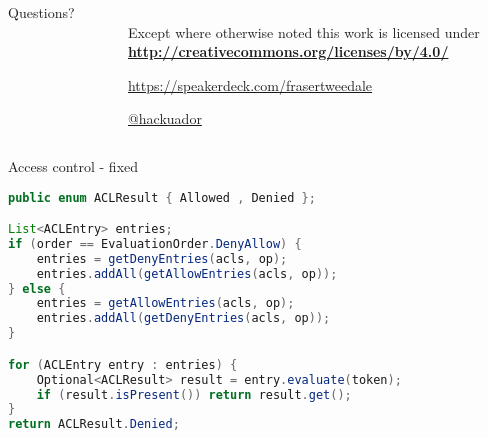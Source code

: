 \documentclass[ignorenonframetext,aspectratio=169,dvipsnames]{beamer}
\begin{document}
\begin{frame}[plain]
\begin{columns}

  \begin{column}{.4\textwidth}
    \begin{center}
    {
        \Large Questions?\\
        \medskip
    }
    \end{center}


  \end{column}

  \begin{column}{.6\textwidth}
    \hypersetup{urlcolor=black}

    \setlength{\parskip}{.5em}

    { \centering

    
    \\
    { \scriptsize
    Except where otherwise noted this work is licensed under
    }\\
    { \footnotesize
      \textbf{\url{http://creativecommons.org/licenses/by/4.0/}}
    }

    \bigskip
    \large \tt

    \url{https://speakerdeck.com/frasertweedale}

    \href{https://twitter.com/hackuador}{@hackuador}

    }
  \end{column}

\end{columns}
\end{frame}









\begin{frame}[fragile]{Access control - fixed}
\begin{lstlisting}[language=Java]
public enum ACLResult { Allowed , Denied };

List<ACLEntry> entries;
if (order == EvaluationOrder.DenyAllow) {
    entries = getDenyEntries(acls, op);
    entries.addAll(getAllowEntries(acls, op));
} else {
    entries = getAllowEntries(acls, op);
    entries.addAll(getDenyEntries(acls, op));
}

for (ACLEntry entry : entries) {
    Optional<ACLResult> result = entry.evaluate(token);
    if (result.isPresent()) return result.get();
}
return ACLResult.Denied;
\end{lstlisting}
\end{frame}
\end{document}
